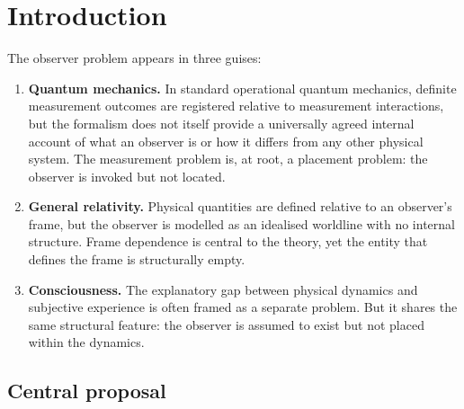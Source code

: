 \documentclass[12pt]{article}
\begin{document}
\begin{abstract}
The paper connects this placement to the crystallisation dynamics (selection as constraint satisfaction) and to the GR programme (observer as linear extension with sampling measure). A brief section addresses implications for the locus of conscious experience within the framework, without claiming a full theory of consciousness.

This is a placement paper: it defines where the observer sits, what it does, and how it connects to both quantum and gravitational regimes. It does not derive a complete measurement theory, a consciousness theory, or new experimental predictions.
\end{abstract}

\section{Introduction}\label{sec:intro}

The observer problem appears in three guises:

\begin{enumerate}
    \item \textbf{Quantum mechanics.} In standard operational quantum mechanics, definite measurement outcomes are registered relative to measurement interactions, but the formalism does not itself provide a universally agreed internal account of what an observer is or how it differs from any other physical system. The measurement problem is, at root, a placement problem: the observer is invoked but not located.

    \item \textbf{General relativity.} Physical quantities are defined relative to an observer's frame, but the observer is modelled as an idealised worldline with no internal structure. Frame dependence is central to the theory, yet the entity that defines the frame is structurally empty.

    \item \textbf{Consciousness.} The explanatory gap between physical dynamics and subjective experience is often framed as a separate problem. But it shares the same structural feature: the observer is assumed to exist but not placed within the dynamics.
\end{enumerate}

\subsection*{Central proposal}
\end{document}
